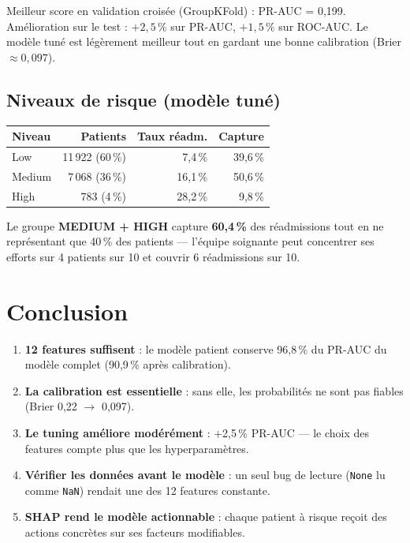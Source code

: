 \documentclass[11pt,a4paper]{article}
\begin{document}
Meilleur score en validation crois\'ee (GroupKFold) : PR-AUC = 0{,}199. Am\'elioration sur le test : $+2{,}5\,\%$ sur PR-AUC, $+1{,}5\,\%$ sur ROC-AUC. Le mod\`ele tun\'e est l\'eg\`erement meilleur tout en gardant une bonne calibration (Brier $\approx 0{,}097$).

\subsection{Niveaux de risque (mod\`ele tun\'e)}

\begin{center}
\begin{tabular}{@{}lrrr@{}}
\toprule
\textbf{Niveau} & \textbf{Patients} & \textbf{Taux r\'eadm.} & \textbf{Capture} \\
\midrule
Low & 11\,922 (60\,\%) & 7{,}4\,\% & 39{,}6\,\% \\
Medium & 7\,068 (36\,\%) & 16{,}1\,\% & 50{,}6\,\% \\
High & 783 (4\,\%) & 28{,}2\,\% & 9{,}8\,\% \\
\bottomrule
\end{tabular}
\end{center}

Le groupe \textbf{MEDIUM + HIGH} capture \textbf{60{,}4\,\%} des r\'eadmissions tout en ne repr\'esentant que 40\,\% des patients --- l'\'equipe soignante peut concentrer ses efforts sur 4 patients sur 10 et couvrir 6 r\'eadmissions sur 10.


\section{Conclusion}

\begin{enumerate}
  \item \textbf{12 features suffisent} : le mod\`ele patient conserve 96{,}8\,\% du PR-AUC du mod\`ele complet (90{,}9\,\% apr\`es calibration).
  \item \textbf{La calibration est essentielle} : sans elle, les probabilit\'es ne sont pas fiables (Brier 0{,}22 $\to$ 0{,}097).
  \item \textbf{Le tuning am\'eliore mod\'er\'ement} : +2{,}5\,\% PR-AUC --- le choix des features compte plus que les hyperparam\`etres.
  \item \textbf{V\'erifier les donn\'ees avant le mod\`ele} : un seul bug de lecture (\texttt{None} lu comme \texttt{NaN}) rendait une des 12 features constante.
  \item \textbf{SHAP rend le mod\`ele actionnable} : chaque patient \`a risque re\c{c}oit des actions concr\`etes sur ses facteurs modifiables.
\end{enumerate}
\end{document}

